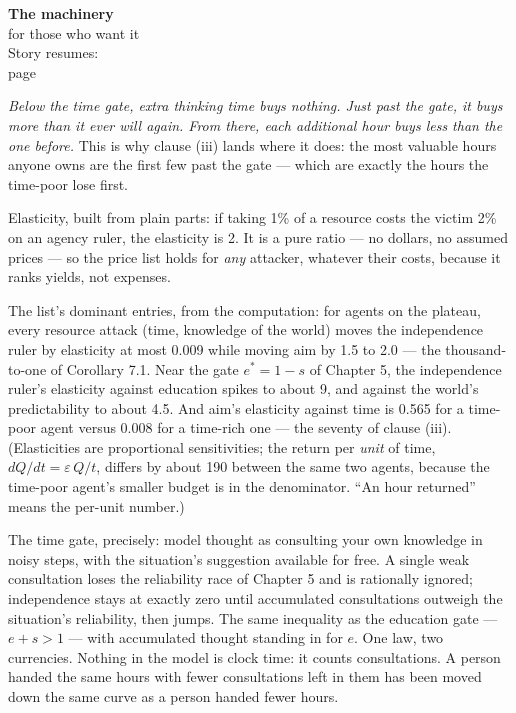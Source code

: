 \begin{machinery}{\textbf{The machinery}\\for those who want it\\[3pt]{\color{muted}Story resumes:\\page~\pageref{partIII}}}

\label{claim-10}

\noindent \emph{Below the
time gate, extra thinking time buys nothing. Just past the gate, it
buys more than it ever will again. From there, each additional hour
buys less than the one before.} This is why clause (iii) lands where
it does: the most valuable hours anyone owns are the first few past
the gate --- which are exactly the hours the time-poor lose first.


Elasticity, built from plain parts: if taking 1\% of a resource costs
the victim 2\% on an agency ruler, the elasticity is 2. It is a pure
ratio --- no dollars, no assumed prices --- so the price list holds for
\emph{any} attacker, whatever their costs, because it ranks yields, not
expenses.

The list's dominant entries, from the computation: for agents on the
plateau, every resource attack (time, knowledge of the world) moves
the independence ruler by elasticity at most 0.009 while moving aim by
1.5 to 2.0 --- the thousand-to-one of Corollary 7.1. Near the gate \(e^{\ast} = 1-s\) of Chapter 5, the independence ruler's elasticity against
education spikes to about 9, and against the world's predictability to
about 4.5. And aim's elasticity against time is 0.565 for a time-poor
agent versus 0.008 for a time-rich one --- the seventy of clause (iii).
(Elasticities are proportional sensitivities; the return per \emph{unit} of
time, \(dQ/dt = \varepsilon\,Q/t\), differs by about 190 between the same two agents,
because the time-poor agent's smaller budget is in the denominator.
``An hour returned'' means the per-unit number.)


The time gate, precisely: model thought as consulting your own
knowledge in noisy steps, with the situation's suggestion available for
free. A single weak consultation loses the reliability race of
Chapter 5 and is rationally ignored; independence stays at exactly zero
until accumulated consultations outweigh the situation's reliability,
then jumps. The same inequality as the education gate --- \(e + s > 1\) ---
with accumulated thought standing in for \(e\). One law, two currencies.
Nothing in the model is clock time: it counts consultations. A person
handed the same hours with fewer consultations left in them has been
moved down the same curve as a person handed fewer hours.


\end{machinery}
